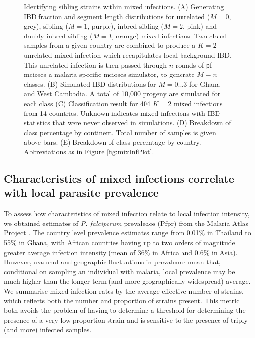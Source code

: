 \documentclass[9pt,lineno]{elife}
\begin{document}
\begin{figure}[htp]
\begin{center}
   \caption{Identifying sibling strains within mixed infections.  (A) Generating IBD fraction and segment length distributions for unrelated ($M=0$, grey), sibling ($M=1$, purple), inbred-sibling ($M=2$, pink) and doubly-inbred-sibling ($M=3$, orange) mixed infections. Two clonal samples from a given country are combined to produce a $K=2$ unrelated mixed infection which recapitulates local background IBD. This unrelated infection is then passed through $n$ rounds of {\texttt pf-meioses} a malaria-specific meioses simulator, to generate $M=n$ classes. (B) Simulated IBD distributions for $M=0...3$ for Ghana and West Cambodia. A total of 10,000 progeny are simulated for each class (C) Classification result for 404 $K=2$ mixed infections from 14 countries. Unknown indicates mixed infections with IBD statistics that were never observed in simulations. (D) Breakdown of class percentage by continent. Total number of samples is given above bars. (E) Breakdown of class percentage by country. Abbreviations as in Figure \ref{fig:mixInfPlot}.}
   \label{fig:classify}
   \end{center}
\end{figure}



\subsection{Characteristics of mixed infections correlate with local parasite prevalence}

To assess how characteristics of mixed infection relate to local infection intensity, we obtained estimates of {\it P. falciparum} prevalence (Pfpr) from the Malaria Atlas Project \citep[see Table~\ref{tab:Pf3k}]{MAP2017}. The country level prevalence estimates range from 0.01\% in Thailand to 55\% in Ghana, with African countries having up to two orders of magnitude greater average infection intensity (mean of 36\% in Africa and 0.6\% in Asia). However, seasonal and geographic fluctuations in prevalence mean that, conditional on sampling an individual with malaria, local prevalence may be much higher than the longer-term (and more geographically widespread) average. We summarise mixed infection rates by the average effective number of strains, which reflects both the number and proportion of strains present.  This metric both avoids the problem of having to determine a threshold for determining the presence of a very low proportion strain and is sensitive to the presence of triply (and more) infected samples.
\end{document}
